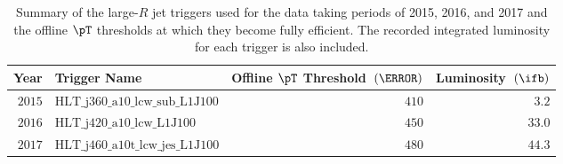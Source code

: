 \begin{table}[htpb]
 \centering 
  \caption{ Summary of the large-$R$ jet triggers used for the data taking
periods of 2015, 2016, and 2017 and the offline $\pT$ thresholds at which
they become fully efficient. The recorded integrated luminosity for each
trigger is also included.}
 \begin{tabular}{@{}rlrr@{}}
  \toprule
  Year   & Trigger Name                 & Offline $\pT$ Threshold~$(\GeV)$ & Luminosity~$\left(\ifb\right)$ \\ \midrule
  $2015$ & $\text{HLT\_j360\_a10\_lcw\_sub\_L1J100}$  & $410$                              & $3.2$                          \\
  $2016$ & $\text{HLT\_j420\_a10\_lcw\_L1J100}$      & $450$                              & $33.0$                         \\
  $2017$ & $\text{HLT\_j460\_a10t\_lcw\_jes\_L1J100}$ & $480$                              & $44.3$                         \\
  \bottomrule
 \end{tabular}
 \label{table:triggers}
\end{table}

